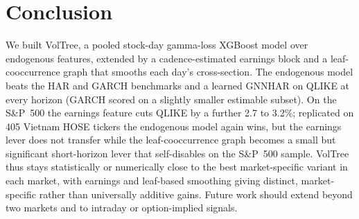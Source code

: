 \documentclass[runningheads,a4paper]{llncs}
\begin{document}
\section{Conclusion}
We built VolTree, a pooled stock-day gamma-loss XGBoost model over endogenous features, extended by a
cadence-estimated earnings block and a leaf-cooccurrence graph that smooths each day's cross-section. The
endogenous model beats the HAR and GARCH benchmarks and a learned GNNHAR on QLIKE at every horizon (GARCH
scored on a slightly smaller estimable subset). On the S\&P~500 the earnings feature cuts QLIKE by a further
2.7 to 3.2\%; replicated on 405 Vietnam HOSE tickers the endogenous model again wins, but the earnings lever
does not transfer while the leaf-cooccurrence graph becomes a small but significant short-horizon lever that
self-disables on the S\&P~500 sample. VolTree thus stays statistically or numerically close to the best
market-specific variant in each market, with earnings and leaf-based smoothing giving distinct,
market-specific rather than universally additive gains. Future work should extend beyond two markets and to
intraday or option-implied signals.
\end{document}
